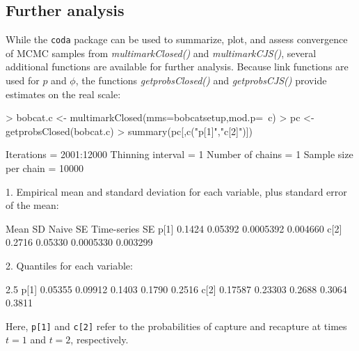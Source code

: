 \documentclass[12pt]{article}
\begin{document}
\subsection{Further analysis}
While the \verb|coda| package can be used to summarize, plot, and assess convergence of MCMC samples from \textit{multimarkClosed()} and \textit{multimarkCJS()}, several additional functions are available for further analysis. Because link functions are used for $p$ and $\phi$, the functions \textit{getprobsClosed()} and \textit{getprobsCJS()} provide estimates on the real scale:
\begin{Schunk}
\begin{Sinput}
> bobcat.c <- multimarkClosed(mms=bobcatsetup,mod.p=~c)
> pc <- getprobsClosed(bobcat.c)
> summary(pc[,c("p[1]","c[2]")])
\end{Sinput}
\begin{Soutput}
Iterations = 2001:12000
Thinning interval = 1 
Number of chains = 1 
Sample size per chain = 10000 

1. Empirical mean and standard deviation for each variable,
   plus standard error of the mean:

       Mean      SD  Naive SE Time-series SE
p[1] 0.1424 0.05392 0.0005392       0.004660
c[2] 0.2716 0.05330 0.0005330       0.003299

2. Quantiles for each variable:

        2.5%
p[1] 0.05355 0.09912 0.1403 0.1790 0.2516
c[2] 0.17587 0.23303 0.2688 0.3064 0.3811
\end{Soutput}
\end{Schunk}
Here, \verb|p[1]| and \verb|c[2]| refer to the probabilities of capture and recapture at times $t=1$ and $t=2$, respectively.
\end{document}
